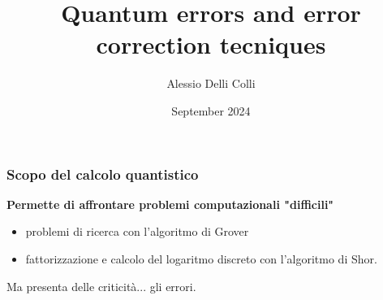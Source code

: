 \documentclass[aspectratio=169]{beamer}
\title{Quantum errors and error correction tecniques}
\author{Alessio Delli Colli}
\date{September 2024}
\begin{document}
\maketitle

%

\begin{frame}
	\frametitle{Scopo del calcolo quantistico}
	\textbf{Permette di affrontare problemi computazionali "difficili"}

	\pause
	\vspace{30pt}
	\begin{itemize}
		\item problemi di ricerca con l'algoritmo di Grover
		      \vspace{30pt}
		      \pause
		\item fattorizzazione e calcolo del logaritmo discreto con l'algoritmo di Shor.


	\end{itemize}
	\vspace{20pt}
	\pause
	Ma presenta delle criticità...
	\pause
	gli errori.
\end{frame}
\end{document}
